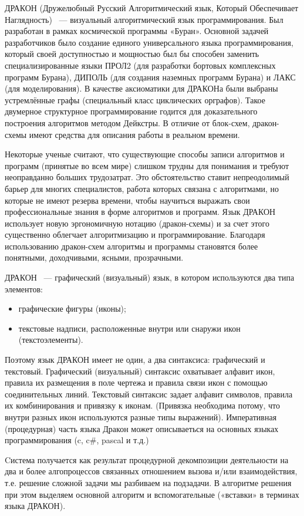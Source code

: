 ДРАКОН (Дружелюбный Русский Алгоритмический язык, Который Обеспечивает Наглядность) ~--- визуальный алгоритмический язык программирования. Был разработан в рамках космической программы «Буран». Основной задачей разработчиков было создание единого универсального языка программирования, который своей доступностью и мощностью был бы способен заменить специализированные языки ПРОЛ2 (для разработки бортовых комплексных программ Бурана), ДИПОЛЬ (для создания наземных программ Бурана) и ЛАКС (для моделирования). В качестве аксиоматики для ДРАКОНа были выбраны устремлённые графы (специальный класс циклических орграфов). Такое двумерное структурное программирование годится для доказательного построения алгоритмов методом Дейкстры. В отличие от блок-схем, дракон-схемы имеют средства для описания работы в реальном времени.

Некоторые ученые считают, что существующие способы записи алгоритмов и программ (принятые во всем мире) слишком трудны для понимания и требуют неоправданно больших трудозатрат. Это обстоятельство ставит непреодолимый барьер для многих специалистов, работа которых связана с алгоритмами, но которые не имеют резерва времени, чтобы научиться выражать свои профессиональные знания в форме алгоритмов и программ. Язык ДРАКОН использует новую эргономичную нотацию (дракон-схемы) и за счет этого существенно облегчает алгоритмизацию и программирование. Благодаря использованию дракон-схем алгоритмы и программы становятся более понятными, доходчивыми, ясными, прозрачными.

ДРАКОН ~--- графический (визуальный) язык, в котором используются два типа элементов:
\begin{itemize}
\item графические фигуры (иконы);
\item текстовые надписи, расположенные внутри или снаружи икон (текстоэлементы).
\end{itemize}

Поэтому язык ДРАКОН имеет не один, а два синтаксиса: графический и текстовый.
Графический (визуальный) синтаксис охватывает алфавит икон, правила их размещения в поле чертежа и правила связи икон с помощью соединительных линий. Текстовый синтаксис задает алфавит символов, правила их комбинирования и привязку к иконам. (Привязка необходима потому, что внутри разных икон используются разные типы выражений). Императивная (процедурная) часть языка Дракон может описываеться на основных языках программирования (c, c\#, pascal и т.д.)

Cистема получается как результат процедурной декомпозиции деятельности на два и более алгопроцессов связанных отношением вызова и/или взаимодействия, т.е. решение сложной задачи мы разбиваем на подзадачи. В алгоритме решения при этом выделяем основной алгоритм и вспомогательные («вставки» в терминах языка ДРАКОН).

